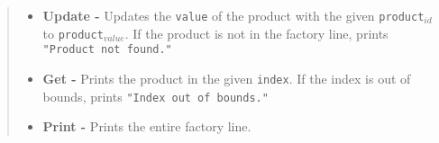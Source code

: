 \documentclass[12pt]{article}
\begin{document}
\begin{quote}
\begin{itemize}
    \item \textbf{Update - } Updates the \texttt{value} of the product with the given \texttt{product$_{id}$} to \texttt{product$_{value}$}. If the product is not in the factory line, prints \verb|"Product not found."|\hfill \\ [10pt]
    \vspace{7pt}
    
    \item \textbf{Get - } Prints the product in the given \texttt{index}.  If the index is out of bounds, prints \verb|"Index out of bounds."| \hfill \\ [10pt]
    \vspace{7pt}
    
    \item \textbf{Print - } Prints the entire factory line. \hfill \\ [10pt]
    \vspace{7pt}
    
\end{itemize}








\end{quote}
\end{document}
